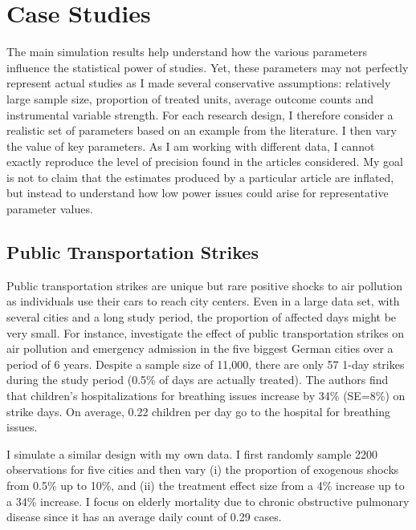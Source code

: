 \documentclass[12pt]{article}
\begin{document}
    \section{Case Studies}  \label{case_studies}

        The main simulation results help understand how the various parameters influence the statistical power of studies. Yet, these parameters may not perfectly represent actual studies as I made several conservative assumptions: relatively large sample size, proportion of treated units, average outcome counts and instrumental variable strength. For each research design, I therefore consider a realistic set of parameters based on an example from the literature. I then vary the value of key parameters. As I am working with different data, I cannot exactly reproduce the level of precision found in the articles considered. My goal is not to claim that the estimates produced by a particular article are inflated, but instead to understand how low power issues could arise for representative parameter values.
            
        \subsection*{Public Transportation Strikes}
        
            Public transportation strikes are unique but rare positive shocks to air pollution as individuals use their cars to reach city centers. Even in a large data set, with several cities and a long study period, the proportion of affected days might be very small. For instance, \cite{bauernschuster_when_2017} investigate the effect of public transportation strikes on air pollution and emergency admission in the five biggest German cities over a period of 6 years. Despite a sample size of 11,000, there are only 57 1-day strikes during the study period (0.5\% of days are actually treated). The authors find that children's hospitalizations for breathing issues increase by 34\% (SE=8\%) on strike days. On average, 0.22 children per day go to the hospital for breathing issues.
            
            I simulate a similar design with my own data. I first randomly sample 2200 observations for five cities and then vary (i) the proportion of exogenous shocks from 0.5\% up to 10\%, and (ii) the treatment effect size from a 4\% increase up to a 34\% increase. I focus on elderly mortality due to chronic obstructive pulmonary disease since it has an average daily count of 0.29 cases. 
            
\end{document}
